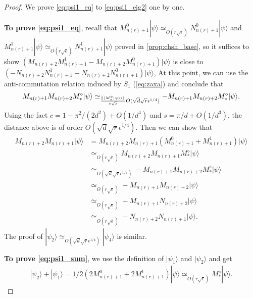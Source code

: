 \documentclass[11pt,letterpaper]{article}
\newcommand{\ket}[1]{|#1\rangle}
\DeclarePairedDelimiter{\norm}{\lVert}{\rVert}
\newcommand{\1}{\mathbb{1}}
\newcommand{\nr}{n(r)}
\newcommand{\se}{\sqrt{\epsilon}}
\newcommand{\qe}{\epsilon^{1/4}}
\newcommand{\sd}{\sqrt{d}}
\newcommand{\sr}{\sqrt{r}}
\newcommand{\appd}[1]{\simeq_{#1}}
\theoremstyle{definition}
\begin{document}
\begin{proof}
	We prove \cref{eq:psi1_eq} to \cref{eq:psi1_eig2} one by one.
	
	\textbf{To prove \cref{eq:psi1_eq}}, 
	recall that $M_{\nr+1}^0 \ket{\psi} \appd{O(r\se)} N_{\nr+1}^0 \ket{\psi}$ 
	and $M_{\nr+1}^1 \ket{\psi} \appd{O(r\se)} N_{\nr+1}^1 \ket{\psi}$ proved in \cref{prop:chsh_base},
	so it suffices to show
	$(M_{\nr+2}M_{\nr+1}^1 - M_{\nr+2}M_{\nr+1}^0) \ket{\psi}$ is close to $(- N_{\nr+2}N_{\nr+1}^1+N_{\nr+2}N_{\nr+1}^0)\ket{\psi}$,
	At this point, we can use the anti-commutation relation induced by $S_1$ (\cref{eq:zaxa}) and conclude that 
	\begin{align*}
		M_{\nr+1}M_{\nr+2} M_\ast^\diamond \ket{\psi} \appd{\frac{\norm{\ket{M_\ast^\diamond\ket{\psi}}}}{c\sqrt{s}}O(\sd\sr\qe)} -M_{\nr+1}M_{\nr+2} M_\ast^\diamond \ket{\psi}.
	\end{align*}
	Using the fact $c = 1 - \pi^2/(2d^2) + O(1/d^4)$ and $s = \pi/d + O(1/d^3)$, the distance above is of order $O(\sd \sr \qe)$.
	Then we can show that 
	\begin{align*}
		M_{\nr+2}M_{\nr+1}\ket{\psi} &= M_{\nr+2}M_{\nr+1}(M_{\nr+1}^0 + M_{\nr+1}^1)\ket{\psi} \\
			&\appd{O(r\se)} M_{\nr+2}M_{\nr+1} M_\ast^\diamond \ket{\psi} \\
			&\appd{O(\sd \sr \qe)} -M_{\nr+1}M_{\nr+2} M_\ast^\diamond \ket{\psi}\\
			&\appd{O(r\se)} -M_{\nr+1}M_{\nr+2} \ket{\psi} \\
			&\appd{O(r\se)} -M_{\nr+1} N_{\nr+2} \ket{\psi} \\
			&\appd{O(r\se)} -N_{\nr+2} N_{\nr+1} \ket{\psi}.
	\end{align*}
	The proof of $\ket{\psi_2} \appd{O(\sd \sr \qe)} \ket{\psi_4}$ is similar.
	
	\textbf{To prove \cref{eq:psi1_sum}}, we use the definition of $\ket{\psi_1}$ and $\ket{\psi_2}$ and get 
	\begin{align*}
		\ket{\psi_2} + \ket{\psi_1} = 1/2( 2M_{\nr+1}^0 + 2M_{\nr+1}^1) \ket{\psi} \appd{O(r\se)} M_\ast^\diamond \ket{\psi}.
	\end{align*}
	

\end{proof}
\end{document}
